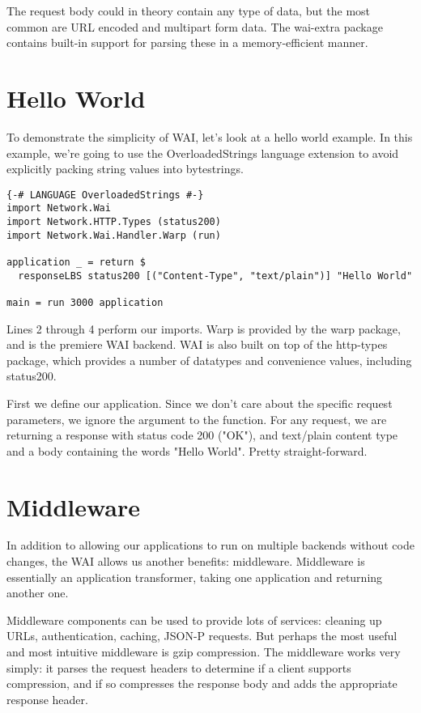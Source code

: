 The request body could in theory contain any type of data, but the most common are 
URL encoded and multipart form data. The wai-extra package contains built-in support 
for parsing these in a memory-efficient manner.

\section{Hello World}

To demonstrate the simplicity of WAI, let's look at a hello world example. 
In this example, we're going to use the OverloadedStrings language extension to avoid 
explicitly packing string values into bytestrings.

\begin{lstlisting}
{-# LANGUAGE OverloadedStrings #-}
import Network.Wai
import Network.HTTP.Types (status200)
import Network.Wai.Handler.Warp (run)

application _ = return $
  responseLBS status200 [("Content-Type", "text/plain")] "Hello World"

main = run 3000 application
\end{lstlisting}%

Lines 2 through 4 perform our imports. Warp is provided by the warp package, and is 
the premiere WAI backend. WAI is also built on top of the http-types package, which 
provides a number of datatypes and convenience values, including status200.

First we define our application. Since we don't care about the specific request 
parameters, we ignore the argument to the function. For any request, we are 
returning a response with status code 200 ("OK"), and text/plain content type 
and a body containing the words "Hello World". Pretty straight-forward.

\section {Middleware}

In addition to allowing our applications to run on multiple backends without 
code changes, the WAI allows us another benefits: middleware. Middleware is essentially 
an application transformer, taking one application and returning another one.

Middleware components can be used to provide lots of services: cleaning up URLs,
authentication, caching, JSON-P requests. But
perhaps the most useful and most intuitive
middleware is gzip compression. The middleware
works very simply: it parses the request headers
to determine if a client supports compression, and
if so compresses the response body and adds the
appropriate response header.

